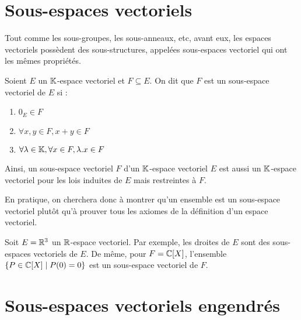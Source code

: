 
\section{Sous-espaces vectoriels}

Tout comme les sous-groupes, les sous-anneaux, etc, avant eux, les espaces vectoriels possèdent des sous-structures, appelées 
sous-espaces vectoriel qui ont les mêmes propriétés. 

\begin{definition}
    Soient $E$ un $\mathbb{K}$-espace vectoriel et $F \subseteq E$. On dit que $F$ est un sous-espace vectoriel de $E$ si :
    \begin{enumerate}
        \item $0_E \in F$ 
        \item $ \forall x, y \in F, x+y \in F$ 
        \item $ \forall \lambda \in \mathbb{K}, \forall x \in F, \lambda.x \in F $
    \end{enumerate}
\end{definition}

\begin{proposition}
    Ainsi, un sous-espace vectoriel $F$ d'un $\mathbb{K}$-espace vectoriel $E$ est aussi un $\mathbb{K}$-espace vectoriel 
    pour les lois induites de $E$ mais restreintes à $F$. 
\end{proposition}

En pratique, on cherchera donc à montrer qu'un ensemble est un sous-espace vectoriel plutôt qu'à prouver tous les 
axiomes de la définition d'un espace vectoriel. 

\begin{example}
    Soit $E = \mathbb{R}^3$ un $\mathbb{R}$-espace vectoriel. 
    Par exemple, les droites de $E$ sont des sous-espaces vectoriels de $E$. 
    De même, pour $F = \mathbb{C}[X]$, l'ensemble $ \{P \in \mathbb{C}[X] \; | \; P(0) = 0 \}$ est un sous-espace vectoriel de $F$. 
\end{example}


\section{Sous-espaces vectoriels engendrés}

